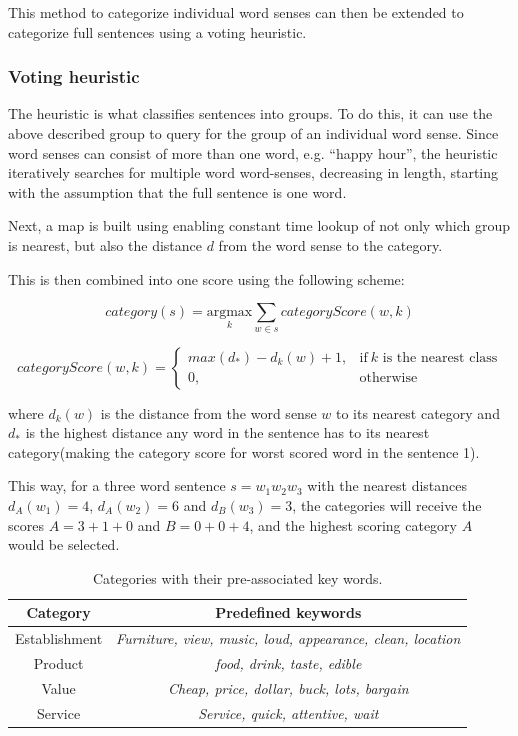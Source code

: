 \documentclass[a4paper,11pt]{kth-mag}
\begin{document}
This method to categorize individual word senses can then be extended to categorize full
sentences using a voting heuristic.

\subsubsection{Voting heuristic}
The heuristic is what classifies sentences into groups.
To do this, it can use the above described group to query for the group of an
individual word sense. Since word senses can consist of more than one word,
e.g. ``happy hour'', the heuristic iteratively searches for multiple word word-senses,
decreasing in length, starting with the assumption that the full sentence is one word.

Next, a map is built using enabling constant time lookup of not only which group is nearest,
but also the distance $d$ from the word sense to the category.

This is then combined into one score using the following scheme:

\begin{equation} \label{eq:heruistic}
  category(s) =
  \underset{k}{\text{argmax}}
  \sum_{w \in s} categoryScore(w, k)
\end{equation}

\begin{equation} \label{eq:heruistic_d}
  categoryScore(w, k) =
  \begin{cases}
    max(d_*) - d_k(w) + 1, & \text{if}\ k \text{ is the nearest class}\\
    0, & \text{otherwise}
  \end{cases}
\end{equation}

where $d_k(w)$ is the distance from the word sense $w$
to its nearest category and $d_*$ is the highest distance any word in the sentence
has to its nearest category(making the category score for worst scored word in the sentence 1).

This way, for a three word sentence $s=w_1w_2w_3$ with the nearest distances
$d_A(w_1)=4$, $d_A(w_2)=6$ and $d_B(w_3)=3$,
the categories will receive the scores $A=3+1+0$ and $B=0+0+4$, and the highest scoring category $A$
would be selected.

\begin{table}[t]
  \centering
  \begin{tabular}{| c | c |}
    \hline
    \textbf{Category} & \textbf{Predefined keywords}\\ \hline
    Establishment & \emph{Furniture, view, music, loud, appearance, clean, location}\\ \hline
    Product & \emph{food, drink, taste, edible}\\ \hline
    Value & \emph{Cheap, price, dollar, buck, lots, bargain}\\ \hline
    Service & \emph{Service, quick, attentive, wait}\\ \hline
  \end{tabular}
  \caption{Categories with their pre-associated key words.}
  \label{tab:cat_words}
\end{table}
\end{document}
